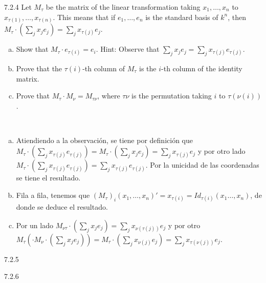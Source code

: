 \documentclass[twoside]{article}
\begin{document}
\begin{ejercicio}{7.2.4}
Let $M_{τ}$ be the matrix of the linear transformation taking $x_1,\dots , x_n$ to $x_{τ(1)},\dots , x_{τ(n)}$.
This means that if $e_1, \dots, e_n$ is the standard basis of $k^n$, then $M_τ \cdot(\sum_j x_je_j) =\sum_j x_{τ(j)}e_j$.
\begin{enumerate}[a.]
\item Show that $M_τ \cdot e_{τ(i)} = e_i$. Hint: Observe that
$\sum_j x_je_j =\sum_j x_{τ(j)}e_{τ(j)}$.
\item Prove that the $τ(i)$-th column of $M_τ$ is the $i$-th column of the identity matrix.
\item Prove that $M_τ \cdot M_ν = M_{τν}$, where $τν$ is the permutation taking $i$ to $τ(ν(i))$.
\end{enumerate}

\end{ejercicio}
\begin{solucion}\
\begin{enumerate}[a.]
\item Atiendiendo a la observación, se tiene por definición que $M_τ \cdot(\sum_j x_{τ(j)}e_{τ(j)})=M_τ \cdot(
\sum_j x_je_j) =\sum_j x_{τ(j)}e_j$ y por otro lado $M_τ \cdot(\sum_j x_{τ(j)}e_{τ(j)})=\sum_j x_{τ(j)}e_{τ(j)}$. Por la unicidad de las coordenadas se tiene el resultado. 
\item Fila a fila, tenemos que $(M_τ)_i(x_1,\dots, x_n)'=x_{\tau(i)}=Id_{\tau(i)}(x_1\dots, x_n)$, de donde se deduce el resultado.  
\item Por un lado $M_{ντ}\cdot(\sum_j x_je_j) =\sum_j x_{\nu(τ(j))}e_j$ y por otro $M_τ (\cdot M_ν \cdot(\sum_j x_je_j))=M_τ \cdot(\sum_j x_{\nu(j)}e_j)=\sum_j x_{\tau(\nu(j))}e_j$.
\end{enumerate}
\end{solucion}
\newpage

\begin{ejercicio}{7.2.5}

\end{ejercicio}
\begin{solucion}

\end{solucion}
\newpage

\begin{ejercicio}{7.2.6}

\end{ejercicio}
\begin{solucion}

\end{solucion}
\newpage
\end{document}

